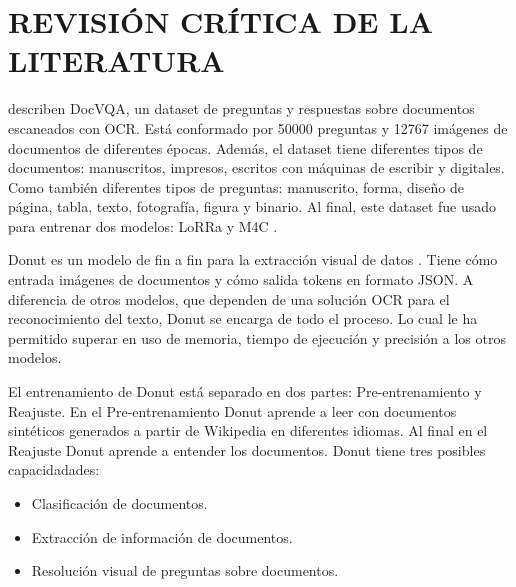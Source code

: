 \documentclass[../main.tex]{subfiles}
\begin{document}
\chapter{REVISIÓN CRÍTICA DE LA LITERATURA}


\citet{mathew2021docvqa} describen DocVQA,
un dataset de preguntas y respuestas sobre documentos escaneados con OCR.
Está conformado por 50000 preguntas y 12767 imágenes de documentos de diferentes épocas.
Además, el dataset tiene diferentes tipos de documentos:
manuscritos, impresos, escritos con máquinas de escribir y digitales.
Como también diferentes tipos de preguntas:
manuscrito, forma, diseño de página, tabla, texto, fotografía, figura y binario.
Al final, este dataset fue usado para entrenar dos modelos:
LoRRa \cite{anderson2018bottomup} y M4C \cite{devlin2019bert}.

%

Donut es un modelo de fin a fin para la extracción visual de datos \cite{kim2022ocrfree}.
Tiene cómo entrada imágenes de documentos y cómo salida tokens en formato JSON.
A diferencia de otros modelos, que dependen de una solución OCR para el reconocimiento del texto,
Donut se encarga de todo el proceso.
Lo cual le ha permitido superar en uso de memoria, tiempo de ejecución y precisión a los otros modelos.

El entrenamiento de Donut está separado en dos partes: Pre-entrenamiento y Reajuste.
En el Pre-entrenamiento Donut aprende a leer con documentos sintéticos generados a partir de Wikipedia en diferentes idiomas.
Al final en el Reajuste Donut aprende a entender los documentos.
Donut tiene tres posibles capacidadades:
\begin{itemize}
	\item Clasificación de documentos.
	\item Extracción de información de documentos.
	\item Resolución visual de preguntas sobre documentos.
\end{itemize}
\end{document}
